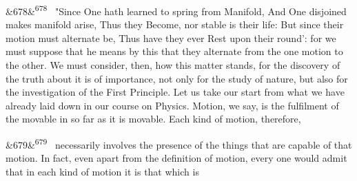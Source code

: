 \documentclass[12pt]{article}
\newcommand{\para}[1][]{\par\noindent\ifx&#1&\else\textsuperscript{\footnotesize #1}~\fi}
\begin{document}
\para[678] "Since One hath learned to spring from Manifold, And One disjoined makes manifold arise, Thus they Become, nor stable is their life: But since their motion must alternate be, Thus have they ever Rest upon their round': for we must suppose that he means by this that they alternate from the one motion to the other. We must consider, then, how this matter stands, for the discovery of the truth about it is of importance, not only for the study of nature, but also for the investigation of the First Principle. Let us take our start from what we have already laid down in our course on Physics. Motion, we say, is the fulfilment of the movable in so far as it is movable. Each kind of motion, therefore,

\para[679] necessarily involves the presence of the things that are capable of that motion. In fact, even apart from the definition of motion, every one would admit that in each kind of motion it is that which is
\end{document}
